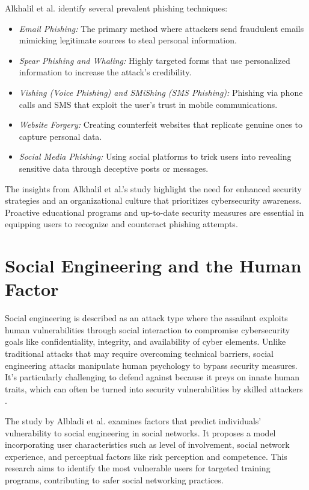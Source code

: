 \documentclass[
  a4paper,  %
  twoside,  %
  bibliography=totoc,
  headsepline,
  cleardoublepage=empty,
  parskip=half,
  draft=false
]{scrbook}
\begin{document}
Alkhalil et al. identify several prevalent phishing techniques:
\begin{itemize}
    \item \textit{Email Phishing:} The primary method where attackers send fraudulent emails mimicking legitimate sources to steal personal information.
    \item \textit{Spear Phishing and Whaling:} Highly targeted forms that use personalized information to increase the attack's credibility.
    \item \textit{Vishing (Voice Phishing) and SMiShing (SMS Phishing):} Phishing via phone calls and SMS that exploit the user's trust in mobile communications.
    \item \textit{Website Forgery:} Creating counterfeit websites that replicate genuine ones to capture personal data.
    \item \textit{Social Media Phishing:} Using social platforms to trick users into revealing sensitive data through deceptive posts or messages.
\end{itemize}

The insights from Alkhalil et al.'s study highlight the need for enhanced security strategies and an organizational culture that prioritizes cybersecurity awareness. Proactive educational programs and up-to-date security measures are essential in equipping users to recognize and counteract phishing attempts.

\section{Social Engineering and the Human Factor}
Social engineering is described as an attack type where the assailant exploits human vulnerabilities through social interaction to compromise cybersecurity goals like confidentiality, integrity, and availability of cyber elements. Unlike traditional attacks that may require overcoming technical barriers, social engineering attacks manipulate human psychology to bypass security measures. It's particularly challenging to defend against because it preys on innate human traits, which can often be turned into security vulnerabilities by skilled attackers \cite{Wang2021}.

The study by Albladi et al. \cite{albladi} examines factors that predict individuals' vulnerability to social engineering in social networks. It proposes a model incorporating user characteristics such as level of involvement, social network experience, and perceptual factors like risk perception and competence. This research aims to identify the most vulnerable users for targeted training programs, contributing to safer social networking practices.
\end{document}
